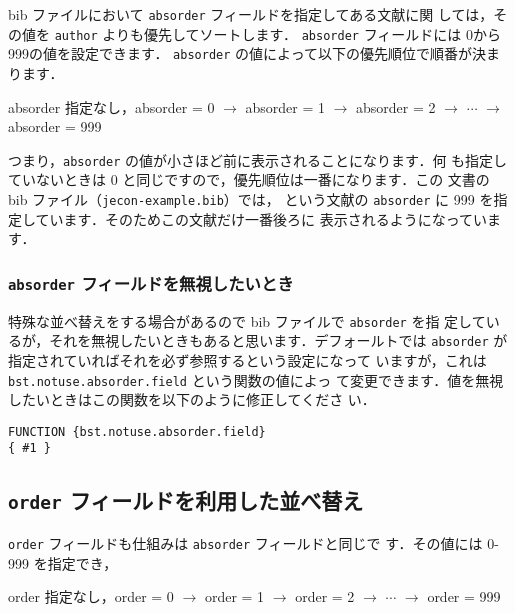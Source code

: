 \documentclass[article]{jlreq}
\begin{document}
bib ファイルにおいて \texttt{absorder} フィールドを指定してある文献に関
しては，その値を \texttt{author} よりも優先してソートします．
\texttt{absorder} フィールドには 0から999の値を設定できます．
\texttt{absorder} の値によって以下の優先順位で順番が決まります．

\begin{screen}
 \begin{center}
 absorder 指定なし，absorder = 0  $\rightarrow$ absorder = 1 $\rightarrow$ absorder = 2
 $\rightarrow$ $\cdots$ $\rightarrow$ absorder = 999
 \end{center}
\end{screen}

つまり，\texttt{absorder} の値が小さほど前に表示されることになります．何
も指定していないときは 0 と同じですので，優先順位は一番になります．この
文書の bib ファイル（\texttt{jecon-example.bib}）では，
\citet{takeda06:_cge_analy_welfar_effec_trade} という文献の
\texttt{absorder} に 999 を指定しています．そのためこの文献だけ一番後ろに
表示されるようになっています．


\subsubsection{\texttt{absorder} フィールドを無視したいとき}

特殊な並べ替えをする場合があるので bib ファイルで \texttt{absorder} を指
定しているが，それを無視したいときもあると思います．デフォールトでは 
\texttt{absorder} が指定されていればそれを必ず参照するという設定になって
いますが，これは \texttt{bst.notuse.absorder.field} という関数の値によっ
て変更できます．値を無視したいときはこの関数を以下のように修正してくださ
い．
\begin{screen}
\begin{verbatim}
FUNCTION {bst.notuse.absorder.field}
{ #1 }
\end{verbatim}
\end{screen}

\subsection{\texttt{order} フィールドを利用した並べ替え}

\texttt{order} フィールドも仕組みは \texttt{absorder} フィールドと同じで
す．その値には 0-999 を指定でき，

\begin{screen}
 \begin{center}
 order 指定なし，order = 0  $\rightarrow$ order = 1 $\rightarrow$ order = 2
 $\rightarrow$ $\cdots$ $\rightarrow$ order = 999
 \end{center}
\end{screen}
\end{document}
